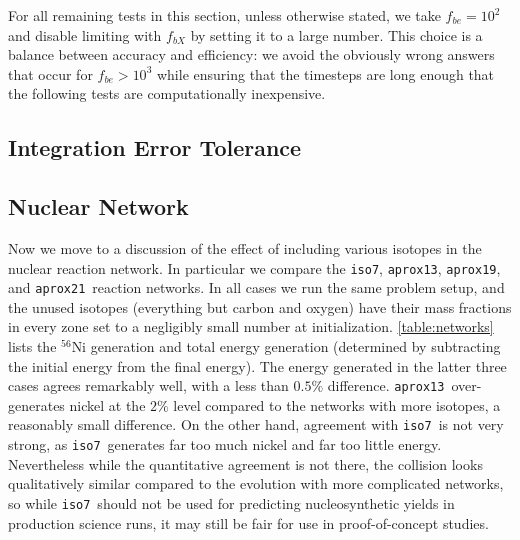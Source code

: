 \documentclass[twocolumn,numberedappendix]{../aastex6}
\newcommand{\isoseven}{\texttt{iso7}}
\newcommand{\aproxthirteen}{\texttt{aprox13}}
\newcommand{\aproxnineteen}{\texttt{aprox19}}
\newcommand{\aproxtwentyone}{\texttt{aprox21}}
\begin{document}

For all remaining tests in this section, unless otherwise stated, we take $f_{be} = 10^2$
and disable limiting with $f_{bX}$ by setting it to a large number. This choice is a balance
between accuracy and efficiency: we avoid the obviously wrong answers that occur for $f_{be} > 10^3$
while ensuring that the timesteps are long enough that the following tests are computationally
inexpensive.


\subsection{Integration Error Tolerance}
\label{sec:parameters:tolerance}




\subsection{Nuclear Network}
\label{sec:parameters:network}

Now we move to a discussion of the effect of including various isotopes
in the nuclear reaction network. In particular we compare the \isoseven, \aproxthirteen,
\aproxnineteen, and \aproxtwentyone\ reaction networks. In all cases we run
the same problem setup, and the unused isotopes (everything but carbon and oxygen)
have their mass fractions in every zone set to a negligibly small number at initialization.
\autoref{table:networks} lists the $^{56}$Ni generation and total energy generation (determined
by subtracting the initial energy from the final energy). The energy generated in the latter
three cases agrees remarkably well, with a less than $0.5\%$ difference. \aproxthirteen\
over-generates nickel at the $2\%$ level compared to the networks with more isotopes, a reasonably
small difference. On the other hand, agreement with \isoseven\ is not very strong, as \isoseven\
generates far too much nickel and far too little energy. Nevertheless while the quantitative
agreement is not there, the collision looks qualitatively similar compared to the evolution with
more complicated networks, so while \isoseven\ should not be used for predicting nucleosynthetic
yields in production science runs, it may still be fair for use in proof-of-concept studies.


\end{document}
